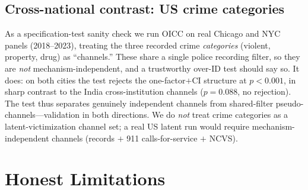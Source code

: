 \documentclass[11pt]{article}
\theoremstyle{definition}
\theoremstyle{remark}
\begin{document}
\subsection{Cross-national contrast: US crime categories}\label{sec:us}

As a specification-test sanity check we run OICC on real Chicago and NYC panels
(2018--2023), treating the three recorded crime \emph{categories} (violent,
property, drug) as ``channels.'' These share a single police recording filter,
so they are \emph{not} mechanism-independent, and a trustworthy over-ID test
should say so. It does: on both cities the test rejects the one-factor$+$CI
structure at $p<0.001$, in sharp contrast to the India cross-institution
channels ($p{=}0.088$, no rejection). The test thus separates genuinely
independent channels from shared-filter pseudo-channels---validation in both
directions. We do \emph{not} treat crime categories as a latent-victimization
channel set; a real US latent run would require mechanism-independent channels
(records $+$ 911 calls-for-service $+$ NCVS).

\section{Honest Limitations}\label{sec:limitations}
\end{document}
